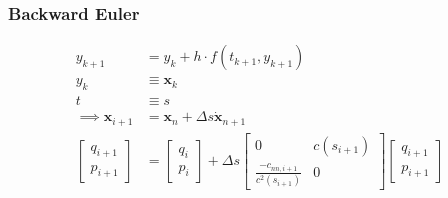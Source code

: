 \documentclass{article}
\begin{document}
\subsubsection{Backward Euler}
\begin{align*}
	y_{k+1}                                                                                                                                                                            & = y_k + h\cdot f(t_{k+1}, y_{k+1})                                                                                                                                                            \\
	y_k                                                                                                                                                                                & \equiv \bm{x}_k                                                                                                                                                                               \\
	t                                                                                                                                                                                  & \equiv s                                                                                                                                                                                      \\
	\implies \bm{x}_{i+1}                                                                                                                                                              & = \bm{x}_n + \Delta s\dot{\bm{x}}_{n+1}                                                                                                                                                       \\
	\begin{bmatrix} q_{i+1} \\ p_{i+1} \end{bmatrix}                                                                                                                                   & = \begin{bmatrix} q_{i} \\ p_{i} \end{bmatrix} + \Delta s \begin{bmatrix} 0 & c(s_{i+1}) \\ \frac{-c_{nn,i+1}}{c^2(s_{i+1})} & 0\end{bmatrix}\begin{bmatrix} q_{i+1} \\ p_{i+1} \end{bmatrix} \\

\end{align*}
\end{document}
